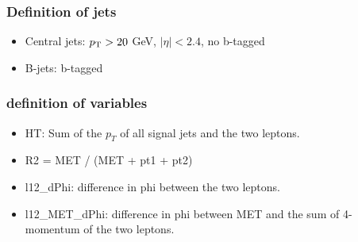 \documentclass[mathserif,serif]{beamer}
\begin{document}
\begin{frame}
\frametitle{Definition of jets}
\normalsize
\begin{itemize}
\item Central jets: $p_{\text{T}}>20$ GeV, $|\eta|<2.4$, no b-tagged
\item B-jets: b-tagged
\end{itemize}
\end{frame}

\begin{frame}
\frametitle{definition of variables}
\normalsize
\begin{itemize}
\item HT: Sum of the $p_T$ of all signal jets and the two leptons.
\item R2 = MET / (MET + pt1 + pt2)
\item l12\_dPhi: difference in phi between the two leptons.
\item l12\_MET\_dPhi: difference in phi between MET and the sum of 4-momentum of the two leptons.
\end{itemize}
\end{frame}


%
%
\end{document}
